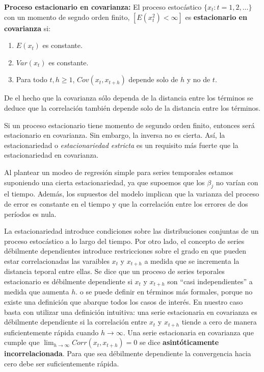 \begin{definicion}
\textbf{Proceso estacionario en covarianza:} El proceso estoc\'astico $\{x_t:t=1,2,\ldots\}$ con un momento de segndo orden finito, $[E(x_t^2)<\infty]$ es \textbf{estacionario en covarianza} si:
\begin{enumerate}
\item $E(x_t)$ es constante.
\item $Var(x_t)$ es constante.
\item Para todo $t,h\geq1$, $Cov(x_t,x_{t+h})$ depende solo de $h$ y no de $t$.
\end{enumerate}
\end{definicion}

De el hecho que la covarianza s\'olo dependa de la distancia entre los t\'erminos se deduce que la correlaci\'on tambi\'en depende solo de la distancia entre los t\'erminos.

Si un proceso estacionario tiene momento de segundo orden finito, entonces ser\'a estacionario en covarianza. Sin embargo, la inversa no es cierta. As\'i, la estacionariedad o \textit{estacionariedad estricta} es un requisito m\'as fuerte que la estacionariedad en covarianza.

Al plantear un modeo de regresi\'on simple para series temporales estamos suponiendo una cierta estacionariedad, ya que supoemos que los $\beta_j$ no var\'ian con el tiempo. Adem\'as, los supuestos del modelo implican que la varianza del proceso de error es constante en el tiempo y que la correlaci\'on entre los errores de dos per\'iodos es nula.


La estacionariedad introduce condiciones sobre las distribuciones conjuntas de un proceso estoc\'astico a lo largo del tiempo. Por otro lado, el concepto de series d\'ebilmente dependientes introduce restricciones sobre el grado en que pueden estar correlacionadas las varaibles $x_t$ y $x_{t+h}$ a medida que se incrementa la distancia teporal entre ellas. Se dice que un proceso de series teporales estacionario es d\'ebilmente dependiente si $x_t$ y $x_{t+h}$ son ``casi independientes'' a medida que aumenta $h$. o se puede definir en t\'erminos m\'as formales, porque no existe una definici\'on que abarque todos los casos de inter\'es. En nuestro caso basta con utilizar una definici\'on intuitiva: una serie estacionaria en covarianza es d\'ebilmente dependiente si la correlaci\'on entre $x_t$ y $x_{t+h}$ tiende a cero de manera suficientemente r\'apida cuando $h\to\infty$. Una serie estacionaria en covarianza que cumple que $\lim_{h\to\infty}{Corr(x_t,x_{t+h})}=0$ se dice \textbf{asint\'oticamente incorrelacionada}. Para que sea d\'ebilmente dependiente la convergencia hacia cero debe ser suficientemente r\'apida.

